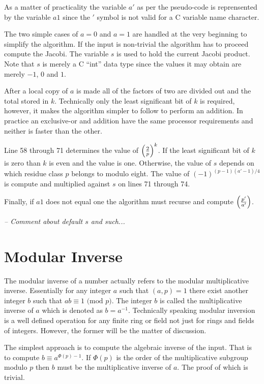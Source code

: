 \documentclass[b5paper]{book}
\begin{document}
As a matter of practicality the variable $a'$ as per the pseudo-code is reprensented by the variable $a1$ since the $'$ symbol is not valid for a C 
variable name character. 

The two simple cases of $a = 0$ and $a = 1$ are handled at the very beginning to simplify the algorithm.  If the input is non-trivial the algorithm
has to proceed compute the Jacobi.  The variable $s$ is used to hold the current Jacobi product.  Note that $s$ is merely a C ``int'' data type since
the values it may obtain are merely $-1$, $0$ and $1$.  

After a local copy of $a$ is made all of the factors of two are divided out and the total stored in $k$.  Technically only the least significant
bit of $k$ is required, however, it makes the algorithm simpler to follow to perform an addition. In practice an exclusive-or and addition have the same 
processor requirements and neither is faster than the other.

Line 58 through 71 determines the value of $\left ( { 2 \over p } \right )^k$.  If the least significant bit of $k$ is zero than
$k$ is even and the value is one.  Otherwise, the value of $s$ depends on which residue class $p$ belongs to modulo eight.  The value of
$(-1)^{(p-1)(a'-1)/4}$ is compute and multiplied against $s$ on lines 71 through 74.  

Finally, if $a1$ does not equal one the algorithm must recurse and compute $\left ( {p' \over a'} \right )$.  

\textit{-- Comment about default $s$ and such...}

\section{Modular Inverse}
\label{sec:modinv}
The modular inverse of a number actually refers to the modular multiplicative inverse.  Essentially for any integer $a$ such that $(a, p) = 1$ there
exist another integer $b$ such that $ab \equiv 1 \mbox{ (mod }p\mbox{)}$.  The integer $b$ is called the multiplicative inverse of $a$ which is
denoted as $b = a^{-1}$.  Technically speaking modular inversion is a well defined operation for any finite ring or field not just for rings and 
fields of integers.  However, the former will be the matter of discussion.

The simplest approach is to compute the algebraic inverse of the input.  That is to compute $b \equiv a^{\Phi(p) - 1}$.  If $\Phi(p)$ is the 
order of the multiplicative subgroup modulo $p$ then $b$ must be the multiplicative inverse of $a$.  The proof of which is trivial.
\end{document}
